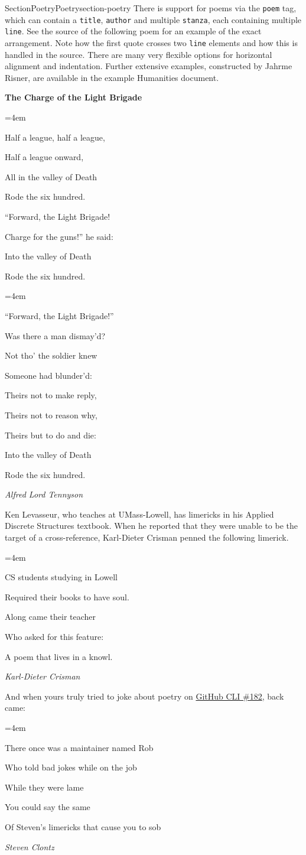 \documentclass[twoside,10pt,]{article}
\newcommand{\mono}[1]{\texttt{#1}}
\numberwithin{equation}{section}
\newenvironment{poem}{\setlength{\parindent}{0em}}{}
\newcommand{\poemTitle}[1]{\begin{center}\large\textbf{#1}\end{center}}
\newenvironment{stanza}{\vspace{0.25 em}\hangindent=4em}{\vspace{1 em}}
\newcommand{\poemauthorleft}[1]{\vspace{-1em}\begin{flushleft}\textit{#1}\end{flushleft}}
\newcommand{\poemlineleft}[1]{{\raggedright{#1}\par}\vspace{-\parskip}}
\begin{document}
\typeout{************************************************}
%
\begin{sectionptx}{Section}{Poetry}{}{Poetry}{}{}{section-poetry}
There is support for poems via the \mono{poem} tag, which can contain a \mono{title}, \mono{author} and multiple \mono{stanza}, each containing multiple \mono{line}.  See the source of the following poem for an example of the exact arrangement.  Note how the first quote crosses two \mono{line} elements and how this is handled in the source.  There are many very flexible options for horizontal alignment and indentation.  Further extensive examples, constructed by Jahrme Risner, are available in the example Humanities document.%
\begin{poem}\label{poem-light-brigade}%
\poemTitle{The Charge of the Light Brigade}
%
\begin{stanza}
\poemlineleft{Half a league, half a league,}
\poemlineleft{Half a league onward,}
\poemlineleft{All in the valley of Death}
\poemlineleft{Rode the six hundred.}
\poemlineleft{``Forward, the Light Brigade!}
\poemlineleft{Charge for the guns!'' he said:}
\poemlineleft{Into the valley of Death}
\poemlineleft{Rode the six hundred.}
\end{stanza}
\begin{stanza}
%
\poemlineleft{``Forward, the Light Brigade!''}
\poemlineleft{Was there a man dismay'd?}
\poemlineleft{Not tho' the soldier knew}
\poemlineleft{Someone had blunder'd:}
\poemlineleft{Theirs not to make reply,}
\poemlineleft{Theirs not to reason why,}
\poemlineleft{Theirs but to do and die:}
\poemlineleft{Into the valley of Death}
\poemlineleft{Rode the six hundred.}
\end{stanza}
\poemauthorleft{Alfred Lord Tennyson}
\end{poem}
Ken Levasseur, who teaches at UMass-Lowell, has limericks in his Applied Discrete Structures textbook.  When he reported that they were unable to be the target of a cross-reference, Karl-Dieter Crisman penned the following limerick.%
\begin{poem}%
\poemTitle{}
\begin{stanza}
\poemlineleft{CS students studying in Lowell}
\poemlineleft{Required their books to have soul.}
\poemlineleft{Along came their teacher}
\poemlineleft{Who asked for this feature:}
\poemlineleft{A poem that lives in a knowl.}
\end{stanza}
\poemauthorleft{Karl-Dieter Crisman}
\end{poem}
And when yours truly tried to joke about poetry on \href{https://github.com/PreTeXtBook/pretext-cli/issues/182}{GitHub CLI \#182}, back came:%
\begin{poem}\label{limerick-clontz}%
\poemTitle{}
\begin{stanza}
\poemlineleft{There once was a maintainer named Rob}
\poemlineleft{Who told bad jokes while on the job}
\poemlineleft{While they were lame}
\poemlineleft{You could say the same}
\poemlineleft{Of Steven's limericks that cause you to sob}
\end{stanza}
\poemauthorleft{Steven Clontz}
\end{poem}
\end{sectionptx}
\end{document}
